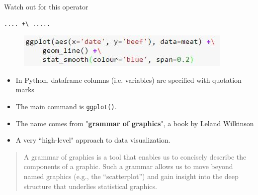 \documentclass{beamer}
\begin{document}
\begin{frame}[fragile]
	\Large
Watch out for this operator
\begin{framed}
\begin{verbatim}
.... +\ .....
\end{verbatim}
\end{framed}
	\begin{figure}
\centering
\includegraphics[width=1.05\linewidth]{plusoperator}
\end{figure}
\end{frame}
\begin{frame}[fragile]
\Large

\begin{itemize}
	\item  In Python, dataframe columns (i.e. variables) are specified with quotation marks

\end{itemize}
\end{frame}
\begin{frame}[fragile]
\Large
\begin{itemize}
\item The main command is \texttt{ggplot()}.
\item The name comes from "\textbf{grammar of graphics}", a book by Leland Wilkinson
\item A very ``high-level" approach to data visualization.
\end{itemize}
\begin{framed}
\begin{quote}
	A grammar of graphics is a tool that enables us to concisely describe the components
	of a graphic. Such a grammar allows us to move beyond named graphics (e.g., the “scatterplot”)
	and gain insight into the deep structure that underlies statistical graphics.
\end{quote}
\end{framed}
\end{frame}
\end{document}
